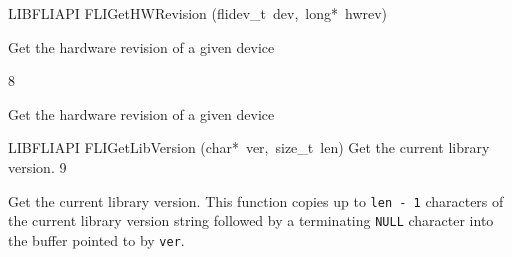 \documentclass{article}
\begin{document}
\begin{cxxfunction}
{LIBFLIAPI}
        {FLIGetHWRevision}
        {(flidev\_t\ dev,\ long*\ hwrev)}
        {
 Get the hardware revision of a given device
 
 }
        {8}
\begin{cxxdoc}

Get the hardware revision of a given device


\end{cxxdoc}
\end{cxxfunction}
\begin{cxxfunction}
{LIBFLIAPI}
        {FLIGetLibVersion}
        {(char*\ ver,\ size\_t\ len)}
        {
 Get the current library version.}
        {9}
\begin{cxxdoc}

Get the current library version.  This function copies up to
\texttt{len - 1} characters of the current library version string
followed by a terminating \texttt{NULL} character into the buffer
pointed to by \texttt{ver}.


\end{cxxdoc}
\end{cxxfunction}
\end{document}
